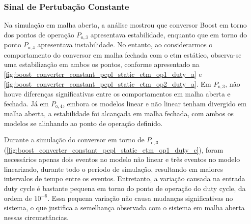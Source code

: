 \subsubsection{Sinal de Pertubação Constante}

Na simulação em malha aberta, a análise mostrou que conversor Boost em torno dos pontos de operação $P_{\mathrm{o}, 3}$ apresentava estabilidade, enquanto que em torno do ponto $P_{\mathrm{o}, 4}$ apresentava instabilidade. No entanto, ao considerarmos o comportamento do conversor em malha fechada com o \acrshort{etm} estático, observa-se uma estabilização em ambos os pontos, conforme apresentado na \autoref{fig:boost_converter_constant_pcpl_static_etm_op1_duty_a} e \autoref{fig:boost_converter_constant_pcpl_static_etm_op2_duty_a}. Em $P_{\mathrm{o}, 3}$, não houve diferenças significativas entre os comportamentos em malha aberta e fechada. Já em $P_{\mathrm{o}, 4}$, embora os modelos linear e não linear tenham divergido em malha aberta, a estabilidade foi alcançada em malha fechada, com ambos os modelos se alinhando ao ponto de operação definido.

Durante a simulação do conversor em torno de $P_{\mathrm{o}, 3}$ (\autoref{fig:boost_converter_constant_pcpl_static_etm_op1_duty_c}), foram necessários apenas dois eventos no modelo não linear e três eventos no modelo linearizado, durante todo o período de simulação, resultando em maiores intervalos de tempo entre os eventos. Entretanto, a variação causada na entrada duty cycle é bastante pequena em torno do ponto de operação do duty cycle, da ordem de $10^{-6}$. Essa pequena variação não causa mudanças significativas no sistema, o que justifica a semelhança observada com o sistema em malha aberta nessas circunstâncias.

